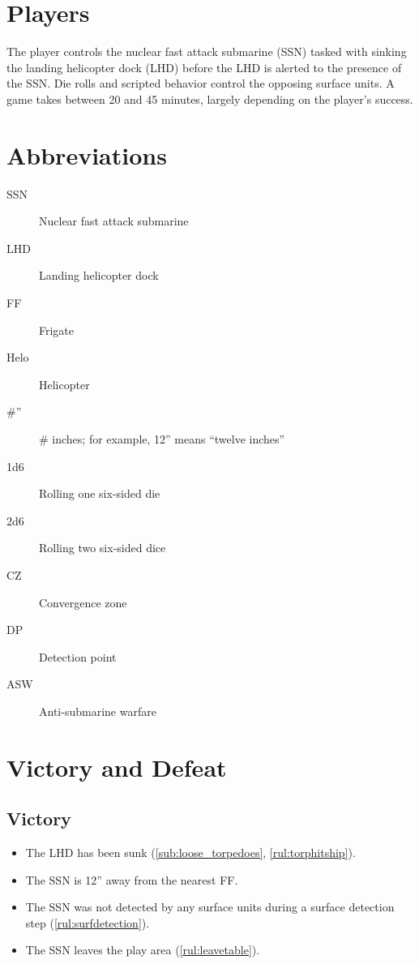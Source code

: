 \documentclass[../TacSubMicroRules.tex]{subfiles}
\begin{document}
\section{Players}%
\label{sec:players}

The player controls the nuclear fast attack submarine (SSN) tasked with sinking the landing helicopter dock (LHD) before the LHD is alerted to the presence of the SSN.
Die rolls and scripted behavior control the opposing surface units.
A game takes between 20 and 45 minutes, largely depending on the player's success.

\section{Abbreviations}%
\label{sec:abbreviations_and_nomenclature}

\begin{description}
    \item[SSN] Nuclear fast attack submarine
    \item[LHD] Landing helicopter dock
    \item[FF] Frigate
    \item[Helo] Helicopter
    \item[\#''] \# inches; for example, 12'' means ``twelve inches''
    \item[1d6] Rolling one six-sided die
    \item[2d6] Rolling two six-sided dice
    \item[CZ] Convergence zone
    \item[DP] Detection point
    \item[ASW] Anti-submarine warfare
\end{description}

\section{Victory and Defeat}%
\label{sec:victory_and_defeat}


\subsection{Victory}%
\label{sub:victory}

\begin{itemize}
    \item The LHD has been sunk (\ref{sub:loose_torpedoes}, \ref{rul:torphitship}).
    \item The SSN is 12'' away from the nearest FF.
    \item The SSN was not detected by any surface units during a surface detection step (\ref{rul:surfdetection}).
    \item The SSN leaves the play area (\ref{rul:leavetable}).
\end{itemize}
\end{document}

